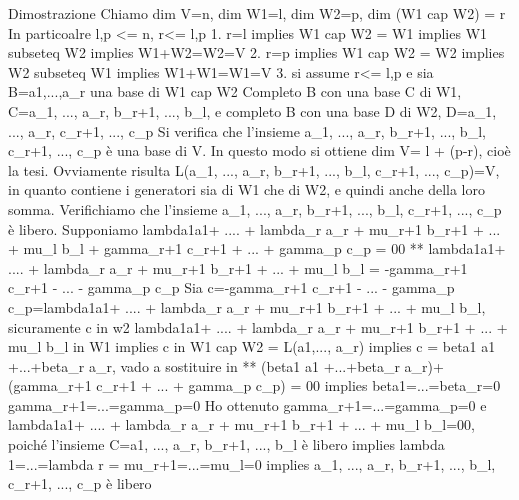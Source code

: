 Dimostrazione
	Chiamo dim V=n, dim W1=l, dim W2=p, dim (W1 cap W2) = r
	In particoalre l,p <= n, r<= l,p
	1. r=l implies W1 cap W2 = W1 implies W1 subseteq W2 implies W1+W2=W2=V %
	2. r=p implies W1 cap W2 = W2 implies W2 subseteq W1 implies W1+W1=W1=V %
	3. si assume r<= l,p e sia B={a1,...,a_r} una base di W1 cap W2
		Completo B con una base C di W1, C={a_1, ..., a_r, b_{r+1}, ..., b_l}, e completo B con una base D di W2, D={a_1, ..., a_r, c_{r+1}, ..., c_p}
		Si verifica che l'insieme {a_1, ..., a_r, b_{r+1}, ..., b_l, c_{r+1}, ..., c_p} è una base di V. In questo modo si ottiene dim V= l + (p-r), cioè la tesi. Ovviamente risulta L(a_1, ..., a_r, b_{r+1}, ..., b_l, c_{r+1}, ..., c_p)=V, in quanto contiene i generatori sia di W1 che di W2, e quindi anche della loro somma. Verifichiamo che l'insieme {a_1, ..., a_r, b_{r+1}, ..., b_l, c_{r+1}, ..., c_p} è libero.
		Supponiamo 
		lambda1a1+ .... + lambda_r a_r + mu_{r+1} b_{r+1} + ... + mu_l b_l + gamma_{r+1} c_{r+1} + ... + gamma_p c_p = 00 **
		lambda1a1+ .... + lambda_r a_r + mu_{r+1} b_{r+1} + ... + mu_l b_l = -gamma_{r+1} c_{r+1} - ... - gamma_p c_p
		Sia c=-gamma_{r+1} c_{r+1} - ... - gamma_p c_p=lambda1a1+ .... + lambda_r a_r + mu_{r+1} b_{r+1} + ... + mu_l b_l, sicuramente c in w2
		lambda1a1+ .... + lambda_r a_r + mu_{r+1} b_{r+1} + ... + mu_l b_l in W1 
		implies c in W1 cap W2 = L(a1,..., a_r) implies c = beta1 a1 +...+beta_r a_r, vado a sostituire in **
		(beta1 a1 +...+beta_r a_r)+(gamma_{r+1} c_{r+1} + ... + gamma_p c_p) = 00 implies 
			beta1=...=beta_r=0
			gamma_{r+1}=...=gamma_p=0 %
		Ho ottenuto gamma_{r+1}=...=gamma_p=0 e
			lambda1a1+ .... + lambda_r a_r + mu_{r+1} b_{r+1} + ... + mu_l b_l=00, poiché l'insieme C={a1, ..., a_r, b_{r+1}, ..., b_l} è libero implies lambda 1=...=lambda r = mu_{r+1}=...=mu_l=0
			implies {a_1, ..., a_r, b_{r+1}, ..., b_l, c_{r+1}, ..., c_p} è libero